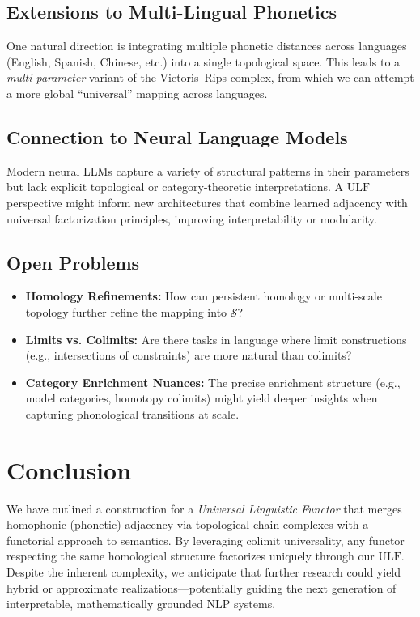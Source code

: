 \documentclass[11pt]{article}
\theoremstyle{definition}
\theoremstyle{remark}
\begin{document}
\subsection{Extensions to Multi-Lingual Phonetics}
One natural direction is integrating multiple phonetic distances across languages (English, Spanish, Chinese, etc.) into a single topological space. This leads to a \emph{multi-parameter} variant of the Vietoris--Rips complex, from which we can attempt a more global ``universal'' mapping across languages.

\subsection{Connection to Neural Language Models}
Modern neural LLMs capture a variety of structural patterns in their parameters but lack explicit topological or category-theoretic interpretations. A \(\mathrm{ULF}\) perspective might inform new architectures that combine learned adjacency with universal factorization principles, improving interpretability or modularity.

\subsection{Open Problems}
\begin{itemize}
    \item \textbf{Homology Refinements:} How can persistent homology or multi-scale topology further refine the mapping into \(\mathcal{S}\)?  
    \item \textbf{Limits vs. Colimits:} Are there tasks in language where limit constructions (e.g., intersections of constraints) are more natural than colimits?  
    \item \textbf{Category Enrichment Nuances:} The precise enrichment structure (e.g., model categories, homotopy colimits) might yield deeper insights when capturing phonological transitions at scale.
\end{itemize}

\section{Conclusion}

We have outlined a construction for a \emph{Universal Linguistic Functor} that merges homophonic (phonetic) adjacency via topological chain complexes with a functorial approach to semantics. By leveraging colimit universality, any functor respecting the same homological structure factorizes uniquely through our \(\mathrm{ULF}\). Despite the inherent complexity, we anticipate that further research could yield hybrid or approximate realizations—potentially guiding the next generation of interpretable, mathematically grounded NLP systems.
\end{document}
